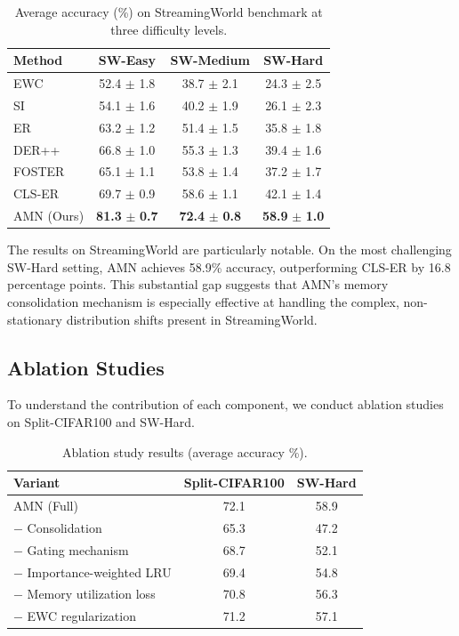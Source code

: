 \documentclass[11pt]{article}
\begin{document}
\begin{table}[h]
\centering
\caption{Average accuracy (\%) on StreamingWorld benchmark at three difficulty levels.}
\label{tab:streaming}
\begin{tabular}{lccc}
\hline
Method & SW-Easy & SW-Medium & SW-Hard \\
\hline
EWC & 52.4 $\pm$ 1.8 & 38.7 $\pm$ 2.1 & 24.3 $\pm$ 2.5 \\
SI & 54.1 $\pm$ 1.6 & 40.2 $\pm$ 1.9 & 26.1 $\pm$ 2.3 \\
ER & 63.2 $\pm$ 1.2 & 51.4 $\pm$ 1.5 & 35.8 $\pm$ 1.8 \\
DER++ & 66.8 $\pm$ 1.0 & 55.3 $\pm$ 1.3 & 39.4 $\pm$ 1.6 \\
FOSTER & 65.1 $\pm$ 1.1 & 53.8 $\pm$ 1.4 & 37.2 $\pm$ 1.7 \\
CLS-ER & 69.7 $\pm$ 0.9 & 58.6 $\pm$ 1.1 & 42.1 $\pm$ 1.4 \\
\hline
AMN (Ours) & \textbf{81.3} $\pm$ \textbf{0.7} & \textbf{72.4} $\pm$ \textbf{0.8} & \textbf{58.9} $\pm$ \textbf{1.0} \\
\hline
\end{tabular}
\end{table}

The results on StreamingWorld are particularly notable. On the most challenging SW-Hard setting, AMN achieves 58.9\% accuracy, outperforming CLS-ER by 16.8 percentage points. This substantial gap suggests that AMN's memory consolidation mechanism is especially effective at handling the complex, non-stationary distribution shifts present in StreamingWorld.

\subsection{Ablation Studies}

To understand the contribution of each component, we conduct ablation studies on Split-CIFAR100 and SW-Hard.

\begin{table}[h]
\centering
\caption{Ablation study results (average accuracy \%).}
\label{tab:ablation}
\begin{tabular}{lcc}
\hline
Variant & Split-CIFAR100 & SW-Hard \\
\hline
AMN (Full) & 72.1 & 58.9 \\
$-$ Consolidation & 65.3 & 47.2 \\
$-$ Gating mechanism & 68.7 & 52.1 \\
$-$ Importance-weighted LRU & 69.4 & 54.8 \\
$-$ Memory utilization loss & 70.8 & 56.3 \\
$-$ EWC regularization & 71.2 & 57.1 \\
\hline
\end{tabular}
\end{table}
\end{document}
